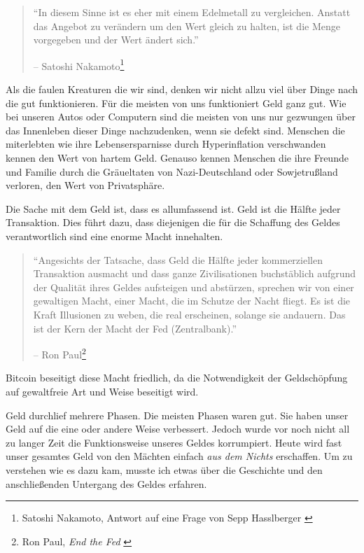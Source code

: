 \begin{quotation}\begin{samepage}
\enquote{In diesem Sinne ist es eher mit einem Edelmetall zu vergleichen. Anstatt das Angebot zu verändern um den Wert gleich zu halten, ist die Menge vorgegeben und der Wert ändert sich.}
\begin{flushright} -- Satoshi Nakamoto\footnote{Satoshi Nakamoto, Antwort auf eine Frage von Sepp
Hasslberger \cite{satoshi-precious-metal}}
\end{flushright}\end{samepage}\end{quotation}

Als die faulen Kreaturen die wir sind, denken wir nicht allzu viel über Dinge
nach die gut funktionieren. Für die meisten von uns funktioniert Geld ganz gut.
Wie bei unseren Autos oder Computern sind die meisten von uns nur gezwungen über
das Innenleben dieser Dinge nachzudenken, wenn sie defekt sind. Menschen die
miterlebten wie ihre Lebensersparnisse durch Hyperinflation verschwanden kennen
den Wert von hartem Geld. Genauso kennen Menschen die ihre Freunde und Familie
durch die Gräueltaten von Nazi-Deutschland oder Sowjetrußland verloren, den Wert
von Privatsphäre.

Die Sache mit dem Geld ist, dass es allumfassend ist. Geld ist die Hälfte jeder
Transaktion. Dies führt dazu, dass diejenigen die für die Schaffung des Geldes
verantwortlich sind eine enorme Macht innehalten.

\begin{quotation}\begin{samepage}
\enquote{Angesichts der Tatsache, dass Geld die Hälfte jeder kommerziellen
Transaktion ausmacht und dass ganze Zivilisationen buchstäblich aufgrund der
Qualität ihres Geldes aufsteigen und abstürzen, sprechen wir von einer
gewaltigen Macht, einer Macht, die im Schutze der Nacht fliegt. Es ist die Kraft
Illusionen zu weben, die real erscheinen, solange sie andauern. Das ist der Kern
der Macht der Fed (Zentralbank).}
\begin{flushright} -- Ron Paul\footnote{Ron Paul, \textit{End the Fed} \cite{end-the-fed}}
\end{flushright}\end{samepage}\end{quotation}

Bitcoin beseitigt diese Macht friedlich, da die Notwendigkeit der Geldschöpfung
auf gewaltfreie Art und Weise beseitigt wird.

Geld durchlief mehrere Phasen. Die meisten Phasen waren gut. Sie haben unser
Geld auf die eine oder andere Weise verbessert. Jedoch wurde vor noch nicht all
zu langer Zeit die Funktionsweise unseres Geldes korrumpiert. Heute wird fast
unser gesamtes Geld von den Mächten einfach \textit{aus dem Nichts} erschaffen.
Um zu verstehen wie es dazu kam, musste ich etwas über die Geschichte und den
anschließenden Untergang des Geldes erfahren.

